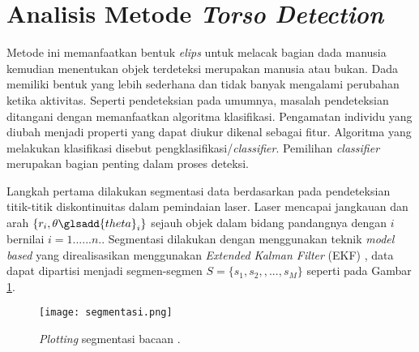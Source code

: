 \section{Analisis Metode \textit{Torso Detection}}
\label{sec:Metode_03}


    Metode ini memanfaatkan bentuk \textit{elips} untuk melacak bagian dada manusia kemudian menentukan objek terdeteksi merupakan manusia atau bukan\cite{c2}. Dada memiliki bentuk yang lebih sederhana dan tidak banyak mengalami perubahan ketika aktivitas. Seperti pendeteksian pada umumnya, masalah pendeteksian ditangani dengan memanfaatkan algoritma klasifikasi. Pengamatan individu yang diubah menjadi properti yang dapat diukur dikenal sebagai fitur. Algoritma yang melakukan klasifikasi disebut pengklasifikasi/\textit{classifier}. Pemilihan \textit{classifier} merupakan bagian penting dalam proses deteksi.

    Langkah pertama dilakukan segmentasi data berdasarkan pada pendeteksian titik-titik diskontinuitas dalam pemindaian laser. Laser mencapai jangkauan dan arah $\{r_i, \theta\glsadd{theta}_i \}$ sejauh objek dalam bidang pandangnya dengan $i$ bernilai $i = 1......n.$. Segmentasi dilakukan dengan menggunakan teknik \textit{model based} yang direalisasikan menggunakan \textit{Extended Kalman Filter} (EKF) \cite{c4}, data dapat dipartisi menjadi segmen-segmen $S = \{s_1, s_2, ,...,s_M\}$ seperti pada Gambar \ref{fig:Ch03_segmentasi}.
        
        \begin{figure}[H]
            \centering
            \texttt{[image: segmentasi.png]}
            \caption{\textit{Plotting} segmentasi bacaan \lidar\cite{c2}.}
            \label{fig:Ch03_segmentasi}
        \end{figure}

